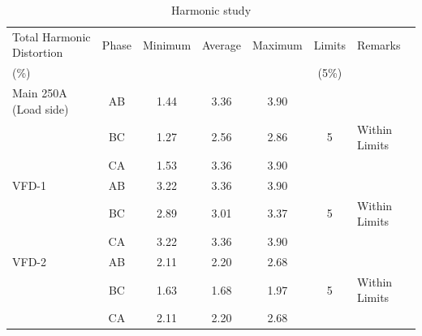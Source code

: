 \begin{table}[!htb]
	\caption{Harmonic study}
	\label{tbl_ch04_elecaudit_harmonicstudy}
	{\scriptsize
	
\begin{tabular}{l|l|l|l|l|l|l}
	\hline
	Total Harmonic Distortion & \multicolumn{1}{c|}{Phase} & \multicolumn{1}{c|}{Minimum} & \multicolumn{1}{c|}{Average} & \multicolumn{1}{c|}{Maximum} & \multicolumn{1}{c|}{Limits} & Remarks \\ 
	(\%) & \multicolumn{1}{c|}{} & \multicolumn{1}{c|}{} & \multicolumn{1}{c|}{} & \multicolumn{1}{c|}{} & \multicolumn{1}{c|}{(5\%)} &  \\ 
	\hline
	Main 250A (Load side) & \multicolumn{1}{c|}{AB} & \multicolumn{1}{c|}{1.44} & \multicolumn{1}{c|}{3.36} & \multicolumn{1}{c|}{3.90} & \multicolumn{1}{c|}{} &  \\ 
	& \multicolumn{1}{c|}{BC} & \multicolumn{1}{c|}{1.27} & \multicolumn{1}{c|}{2.56} & \multicolumn{1}{c|}{2.86} & \multicolumn{1}{c|}{5} & Within  Limits \\ 
	& \multicolumn{1}{c|}{CA} & \multicolumn{1}{c|}{1.53} & \multicolumn{1}{c|}{3.36} & \multicolumn{1}{c|}{3.90} & \multicolumn{1}{c|}{} &  \\ 
	\hline
	VFD-1 & \multicolumn{1}{c|}{AB} & \multicolumn{1}{c|}{3.22} & \multicolumn{1}{c|}{3.36} & \multicolumn{1}{c|}{3.90} & \multicolumn{1}{c|}{} &  \\ 
	& \multicolumn{1}{c|}{BC} & \multicolumn{1}{c|}{2.89} & \multicolumn{1}{c|}{3.01} & \multicolumn{1}{c|}{3.37} & \multicolumn{1}{c|}{5} & Within  Limits \\ 
	& \multicolumn{1}{c|}{CA} & \multicolumn{1}{c|}{3.22} & \multicolumn{1}{c|}{3.36} & \multicolumn{1}{c|}{3.90} & \multicolumn{1}{c|}{} &  \\ 
	\hline
	VFD-2 & \multicolumn{1}{c|}{AB} & \multicolumn{1}{c|}{2.11} & \multicolumn{1}{c|}{2.20} & \multicolumn{1}{c|}{2.68} & \multicolumn{1}{c|}{} &  \\ 
	& \multicolumn{1}{c|}{BC} & \multicolumn{1}{c|}{1.63} & \multicolumn{1}{c|}{1.68} & \multicolumn{1}{c|}{1.97} & \multicolumn{1}{c|}{5} & Within Limits \\ 
	& \multicolumn{1}{c|}{CA} & \multicolumn{1}{c|}{2.11} & \multicolumn{1}{c|}{2.20} & \multicolumn{1}{c|}{2.68} & \multicolumn{1}{c|}{} &  \\ 
	\hline
\end{tabular}

		
	}%
\end{table}

